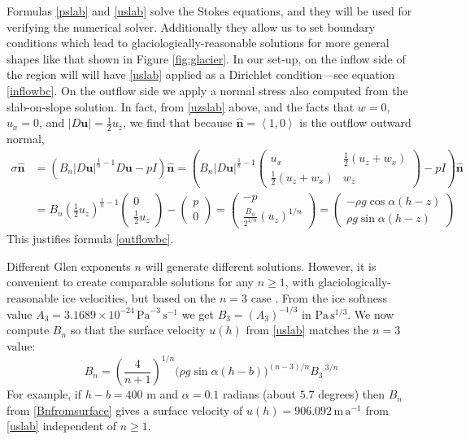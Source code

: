 \documentclass[letterpaper,final,12pt,reqno]{amsart}
\newcommand{\hbn}{\hat{\mathbf{n}}}
\newcommand{\bu}{\mathbf{u}}
\begin{document}
Formulas \eqref{pslab} and \eqref{uslab} solve the Stokes equations, and they will be used for verifying the numerical solver.  Additionally they allow us to set boundary conditions which lead to glaciologically-reasonable solutions for more general shapes like that shown in Figure \ref{fig:glacier}.  In our set-up, on the inflow side of the region will will have \eqref{uslab} applied as a Dirichlet condition---see equation \eqref{inflowbc}.  On the outflow side we apply a normal stress also computed from the slab-on-slope solution.  In fact, from \eqref{uzslab} above, and the facts that $w=0$, $u_x=0$, and $|D\bu| = \frac{1}{2} u_z$, we find that because $\hbn=\left<1,0\right>$ is the outflow outward normal,
\begin{align*}
\sigma \hbn &= \left(B_n |D\bu|^{\frac{1}{n}-1} D\bu - pI\right)\hbn = \left(B_n |D\bu|^{\frac{1}{n}-1} \begin{pmatrix} u_x & \frac{1}{2}(u_z+w_x) \\ \frac{1}{2}(u_z+w_x) & w_z \end{pmatrix} - pI\right)\hbn \\
    &= B_n \left(\frac{1}{2} u_z\right)^{\frac{1}{n}-1} \begin{pmatrix} 0 \\ \frac{1}{2} u_z \end{pmatrix} - \begin{pmatrix} p \\ 0 \end{pmatrix} = \begin{pmatrix} - p \\ \frac{B_n}{2^{1/n}} (u_z)^{1/n} \end{pmatrix} = \begin{pmatrix} - \rho g\cos\alpha (h-z) \\ \rho g\sin\alpha (h-z) \end{pmatrix}
\end{align*}
This justifies formula \eqref{outflowbc}.

Different Glen exponents $n$ will generate different solutions.  However, it is convenient to create comparable solutions for any $n\ge 1$, with glaciologically-reasonable ice velocities, but based on the $n=3$ case \cite{GreveBlatter2009}.  From the ice softness value $A_3 = 3.1689 \times 10^{-24} \,\text{Pa}^{-3}\,\text{s}^{-1}$ we get $B_3 = (A_3)^{-1/3}$ in $\text{Pa}\,\text{s}^{1/3}$.  We now compute $B_n$ so that the surface velocity $u(h)$ from \eqref{uslab} matches the $n=3$ value:
\begin{equation}
B_n = \left(\frac{4}{n+1}\right)^{1/n} \Big(\rho g \sin\alpha (h-b)\Big)^{(n-3)/n} {B_3\,}^{3/n}  \label{Bnfromsurface}
\end{equation}
For example, if $h-b=400$ m and $\alpha=0.1$ radians (about $5.7$ degrees) then $B_n$ from \eqref{Bnfromsurface} gives a surface velocity of $u(h)=906.092 \,\text{m}\,\text{a}^{-1}$ from \eqref{uslab} independent of $n\ge 1$.
\end{document}
